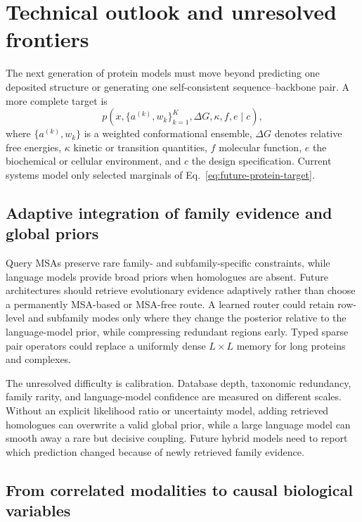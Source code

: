\documentclass[10pt]{article}
\begin{document}
\section{Technical outlook and unresolved frontiers}

The next generation of protein models must move beyond predicting one deposited structure or
generating one self-consistent sequence--backbone pair.  A more complete target is
\begin{equation}
p\!\left(
x,\{a^{(k)},w_k\}_{k=1}^{K},
\Delta G,\kappa,f,e
\mid c\right),
\label{eq:future-protein-target}
\end{equation}
where $\{a^{(k)},w_k\}$ is a weighted conformational ensemble, $\Delta G$ denotes relative free
energies, $\kappa$ kinetic or transition quantities, $f$ molecular function, $e$ the biochemical or
cellular environment, and $c$ the design specification.  Current systems model only selected
marginals of Eq.~\ref{eq:future-protein-target}.

\subsection{Adaptive integration of family evidence and global priors}

Query MSAs preserve rare family- and subfamily-specific constraints, while language models provide
broad priors when homologues are absent.  Future architectures should retrieve evolutionary
evidence adaptively rather than choose a permanently MSA-based or MSA-free route.  A learned router
could retain row-level and subfamily modes only where they change the posterior relative to the
language-model prior, while compressing redundant regions early.  Typed sparse pair operators could
replace a uniformly dense $L\times L$ memory for long proteins and complexes.

The unresolved difficulty is calibration.  Database depth, taxonomic redundancy, family rarity,
and language-model confidence are measured on different scales.  Without an explicit likelihood
ratio or uncertainty model, adding retrieved homologues can overwrite a valid global prior, while a
large language model can smooth away a rare but decisive coupling.  Future hybrid models need to
report which prediction changed because of newly retrieved family evidence.

\subsection{From correlated modalities to causal biological variables}
\end{document}
